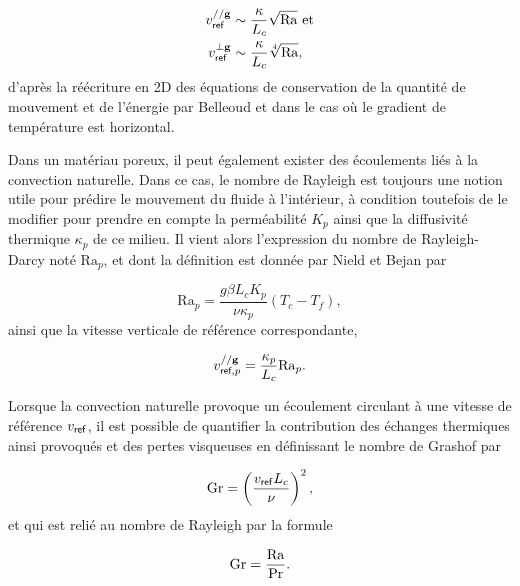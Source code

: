 \begin{subequations}
	\begin{align}
		v_{\sf ref}^{// \mathbf g} &\sim \frac{\kappa}{L_c}\sqrt{\mathrm{Ra}} \text{ et}	\label{eq:VitesseReferenceV_Rayleigh}\\
		v_{\sf ref}^{\perp \mathbf g} &\sim \frac{\kappa}{L_c}\sqrt[4]{\mathrm{Ra}},	\label{eq:VitesseReferenceH_Rayleigh}
	\end{align}
	\label{eq:VitesseReference_Rayleigh}%
\end{subequations}
d'après la réécriture en 2D des équations de conservation de la quantité de mouvement et de l'énergie par Belleoud \cite{belleoud_etude_2016} et dans le cas où le gradient de température est horizontal.\medskip

Dans un matériau poreux, il peut également exister des écoulements liés à la convection naturelle. Dans ce cas, le nombre de Rayleigh est toujours une notion utile pour prédire le mouvement du fluide à l'intérieur, à condition toutefois de le modifier pour prendre en compte la perméabilité $K_p$ ainsi que la diffusivité thermique $\kappa_p$ de ce milieu. Il vient alors l'expression du nombre de Rayleigh-Darcy noté $\mathrm{Ra}_p$, et dont la définition est donnée par Nield et Bejan \cite{nield_convection_2013} par

\begin{equation}
	\mathrm{Ra}_p = \frac{g \beta L_c K_p}{\nu \kappa_p} (T_c-T_f),
	\label{eq:NbrRayleigh_poreux}
\end{equation}
ainsi que la vitesse verticale de référence correspondante, 

\begin{equation}
	v_{\textsf{ref},p}^{// \mathbf g} = \frac{\kappa_p}{L_c} \mathrm{Ra}_p.
	\label{eq:VitesseReference_Rayleigh_poreux}
\end{equation}


Lorsque la convection naturelle provoque un écoulement circulant à une vitesse de référence $v_{\sf ref}$, il est possible de quantifier la contribution des échanges thermiques ainsi provoqués et des pertes visqueuses en définissant le nombre de Grashof par

\begin{equation}
	\mathrm{Gr} = \left( \frac{v_{\sf ref} L_c}{\nu} \right)^2,
	\label{eq:NbrGrashof}
\end{equation}
et qui est relié au nombre de Rayleigh par la formule

\begin{equation}
	\mathrm{Gr} = \frac{\mathrm{Ra}}{\mathrm{Pr}}.
	\label{eq:NbrGrashof_RayleighSurPrandtl}
\end{equation}


